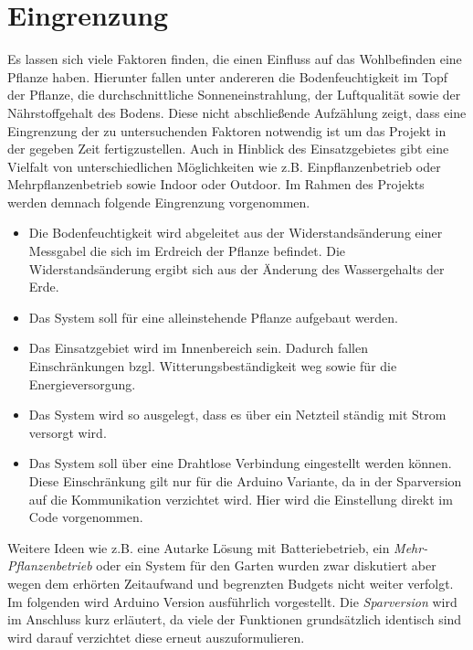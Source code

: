 ﻿\documentclass[]{IEEEtran}
\begin{document}
\section{Eingrenzung}
Es lassen sich viele Faktoren finden, die einen Einfluss auf das Wohlbefinden eine Pflanze haben. Hierunter fallen unter andereren  die Bodenfeuchtigkeit im Topf der Pflanze, die durchschnittliche Sonneneinstrahlung, der Luftqualität sowie der Nährstoffgehalt des Bodens. Diese nicht abschließende Aufzählung zeigt, dass eine Eingrenzung der zu untersuchenden Faktoren notwendig ist um das Projekt in der gegeben Zeit fertigzustellen.
Auch in Hinblick des Einsatzgebietes gibt eine Vielfalt von unterschiedlichen Möglichkeiten wie z.B. Einpflanzenbetrieb oder Mehrpflanzenbetrieb sowie Indoor oder Outdoor. Im Rahmen des Projekts werden demnach folgende Eingrenzung vorgenommen.
\begin{itemize}
	\item Die Bodenfeuchtigkeit wird abgeleitet aus der Widerstandsänderung einer Messgabel die sich im Erdreich der Pflanze befindet. Die Widerstandsänderung ergibt sich aus der Änderung des Wassergehalts der Erde.
	\item Das System soll für eine alleinstehende Pflanze aufgebaut werden. 
	\item Das Einsatzgebiet wird im Innenbereich sein. Dadurch fallen Einschränkungen bzgl. Witterungsbeständigkeit weg sowie für die Energieversorgung.
	\item Das System wird so ausgelegt, dass es über ein Netzteil ständig mit Strom versorgt wird.
	\item Das System soll über eine Drahtlose Verbindung eingestellt werden können. Diese Einschränkung gilt nur für die Arduino Variante, da in der Sparversion auf die Kommunikation verzichtet wird. Hier wird die Einstellung direkt im Code vorgenommen.

\end{itemize}

Weitere Ideen wie z.B. eine Autarke Lösung mit Batteriebetrieb, ein \emph{Mehr-Pflanzenbetrieb} oder ein System für den Garten wurden zwar diskutiert aber wegen dem erhörten Zeitaufwand und begrenzten Budgets nicht weiter verfolgt. 
Im folgenden wird Arduino Version ausführlich vorgestellt. Die \emph{Sparversion} wird im Anschluss kurz erläutert, da viele der Funktionen grundsätzlich identisch sind wird darauf verzichtet diese erneut auszuformulieren. 
\end{document}
